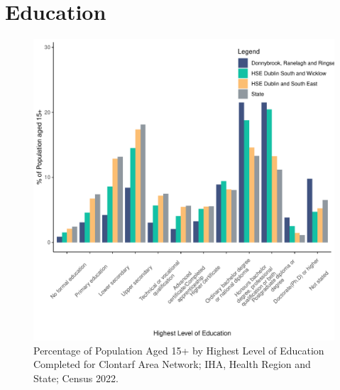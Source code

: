 \documentclass{article}
\begin{document}
\section{Education}\label{sect:Edu}
\begin{figure}[H]
	\centering
	\includegraphics[width = 120mm]{../figures/EduED.pdf}
	\caption{Percentage of Population Aged 15+ by Highest Level of Education Completed for Clontarf Area Network; IHA, Health Region and State; Census 2022.}
	\label{fig:vbnv}
	\end{figure}
\end{document}
